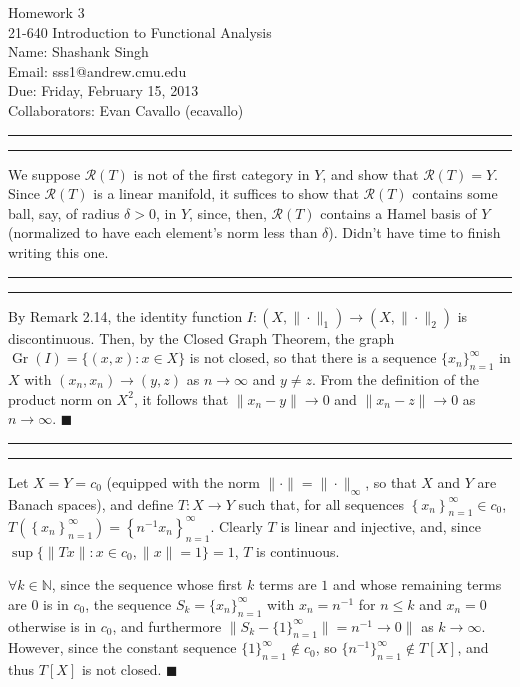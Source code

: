 \documentclass[11pt]{article}
\makeatletter
\newcounter{questionCounter}
\newcounter{partCounter}[questionCounter]
\newenvironment{question}[2][\arabic{questionCounter}]{%
    \setcounter{partCounter}{0}%
    \vspace{.25in} \hrule \vspace{0.5em}%
        \noindent{\bf #2}%
    \vspace{0.8em} \hrule \vspace{.10in}%
    \addtocounter{questionCounter}{1}%
}{}
\newcommand{\myname}{Shashank Singh}
\newcommand{\myandrew}{sss1@andrew.cmu.edu}
\newcommand{\myclass}{21-640 Introduction to Functional Analysis}
\newcommand{\myhwnum}{3}
\newcommand{\duedate}{Friday, February 15, 2013}
\newcommand{\mycollaborators}{Evan Cavallo (ecavallo)}
\renewcommand{\qed}{\quad $\blacksquare$}
\newcommand{\inv}{^{-1}}
\newcommand{\Gr}{\operatorname{Gr}} %
\newcommand{\N}{\mathbb{N}} %
\newcommand{\Ran}{\mathcal{R}} %
\makeatother
\begin{document}
\thispagestyle{plain}

{\Large Homework \myhwnum} \\
\myclass \\
Name: \myname \\
Email: \myandrew \\
Due: \duedate \\
Collaborators: \mycollaborators

\begin{question}{Problem 3}
We suppose $\Ran(T)$ is not of the first category in $Y$, and show that
$\Ran(T) = Y$. Since $\Ran(T)$ is a linear manifold, it suffices to show that
$\Ran(T)$ contains some ball, say, of radius $\delta > 0$, in $Y$, since, then,
$\Ran(T)$ contains a Hamel basis of $Y$ (normalized to have each element's norm
less than $\delta$). Didn't have time to finish writing this one.
\end{question}

\begin{question}{Problem 4}
By Remark 2.14, the identity function $I : (X,\|\cdot\|_1) \rightarrow
(X,\|\cdot\|_2)$ is discontinuous. Then, by the Closed Graph Theorem, the graph
$\Gr(I) = \{(x,x) : x \in X\}$ is not closed, so that there is a sequence
$\{x_n\}_{n = 1}^{\infty}$ in $X$ with $(x_n,x_n) \rightarrow (y,z)$ as
$n \rightarrow \infty$ and $y \neq z$. From the definition of the product norm
on $X^2$, it follows that $\|x_n - y\| \rightarrow 0$ and
$\|x_n - z\| \rightarrow 0$ as $n \rightarrow \infty$. \qed
\end{question}

\begin{question}{Problem 6}
Let $X = Y = c_0$ (equipped with the norm $\|\cdot\| = \|\cdot\|_{\infty}$, so
that $X$ and $Y$ are Banach spaces), and define $T: X \rightarrow Y$ such that,
for all sequences $\left\{ x_n \right\}_{n = 1}^{\infty} \in c_0$,
$T\left( \left\{ x_n \right\}_{n = 1}^{\infty} \right)
 = \left\{ n\inv x_n \right\}_{n = 1}^{\infty}$. Clearly $T$ is linear and
injective, and, since $\sup \{\|Tx\| : x \in c_0, \|x\| = 1\} = 1$, $T$ is
continuous.

$\forall k \in \N$, since the sequence whose first $k$ terms are $1$ and whose
remaining terms are $0$ is in $c_0$, the sequence
$S_k = \{x_n\}_{n = 1}^{\infty}$ with $x_n = n\inv$ for $n \leq k$ and
$x_n = 0$ otherwise is in $c_0$, and furthermore $\|S_k - \{1\}_{n =
1}^{\infty}\| = n\inv \rightarrow 0\|$ as $k \rightarrow \infty$. However,
since the constant sequence $\{1\}_{n = 1}^{\infty} \notin c_0$, so
$\{n\inv\}_{n = 1}^{\infty} \notin T[X]$, and thus $T[X]$ is not closed. \qed
\end{question}
\end{document}
